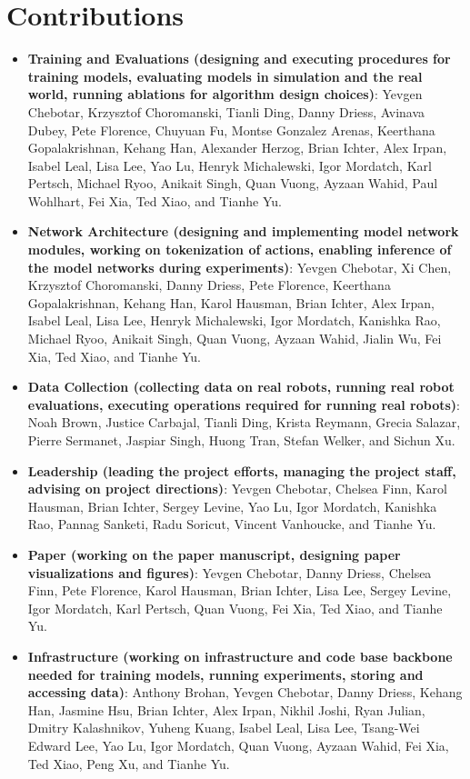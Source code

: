 \clearpage
\appendix

\section{Contributions}
\label{sec:contributions}
\begin{itemize}
    \item \textbf{Training and Evaluations (designing and executing procedures for training models, evaluating models in simulation and the real world, running ablations for algorithm design choices)}: Yevgen Chebotar, Krzysztof Choromanski, Tianli Ding, Danny Driess, Avinava Dubey, Pete Florence, Chuyuan Fu, Montse Gonzalez Arenas, Keerthana Gopalakrishnan, Kehang Han, Alexander Herzog, Brian Ichter, Alex Irpan, Isabel Leal, Lisa Lee, Yao Lu, Henryk Michalewski, Igor Mordatch, Karl Pertsch, Michael Ryoo, Anikait Singh, Quan Vuong, Ayzaan Wahid, Paul Wohlhart, Fei Xia, Ted Xiao, and Tianhe Yu.
    \item \textbf{Network Architecture (designing and implementing model network modules, working on tokenization of actions, enabling inference of the model networks during experiments)}: Yevgen Chebotar, Xi Chen, Krzysztof Choromanski, Danny Driess, Pete Florence, Keerthana Gopalakrishnan, Kehang Han, Karol Hausman, Brian Ichter, Alex Irpan, Isabel Leal, Lisa Lee, Henryk Michalewski, Igor Mordatch, Kanishka Rao, Michael Ryoo, Anikait Singh, Quan Vuong, Ayzaan Wahid, Jialin Wu, Fei Xia, Ted Xiao, and Tianhe Yu.
    \item \textbf{Data Collection (collecting data on real robots, running real robot evaluations, executing operations required for running real robots)}: Noah Brown, Justice Carbajal, Tianli Ding, Krista Reymann, Grecia Salazar, Pierre Sermanet, Jaspiar Singh, Huong Tran, Stefan Welker, and Sichun Xu.
    \item \textbf{Leadership (leading the project efforts, managing the project staff, advising on project directions)}: Yevgen Chebotar, Chelsea Finn, Karol Hausman, Brian Ichter, Sergey Levine, Yao Lu, Igor Mordatch, Kanishka Rao, Pannag Sanketi, Radu Soricut, Vincent Vanhoucke, and Tianhe Yu.
    \item \textbf{Paper (working on the paper manuscript, designing paper visualizations and figures)}: Yevgen Chebotar, Danny Driess, Chelsea Finn, Pete Florence, Karol Hausman, Brian Ichter, Lisa Lee, Sergey Levine, Igor Mordatch, Karl Pertsch, Quan Vuong, Fei Xia, Ted Xiao, and Tianhe Yu.
    \item \textbf{Infrastructure (working on infrastructure and code base backbone needed for training models, running experiments, storing and accessing data)}: Anthony Brohan, Yevgen Chebotar, Danny Driess, Kehang Han, Jasmine Hsu, Brian Ichter, Alex Irpan, Nikhil Joshi, Ryan Julian, Dmitry Kalashnikov, Yuheng Kuang, Isabel Leal, Lisa Lee, Tsang-Wei Edward Lee, Yao Lu, Igor Mordatch, Quan Vuong, Ayzaan Wahid, Fei Xia, Ted Xiao, Peng Xu, and Tianhe Yu.
\end{itemize}
